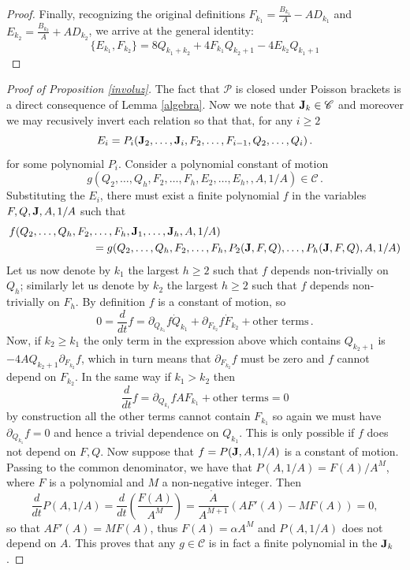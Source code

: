 \documentclass[reqno,11pt]{amsart}
\theoremstyle{plain}
\numberwithin{equation}{section}
\newcommand{\I}{{\texttt{\bf J}}}
\begin{document}
{\begin{proof}
Finally, recognizing the original definitions $F_{k_1} = \frac{B_{k_1}}{A} - AD_{k_1}$ and $E_{k_2} = \frac{B_{k_2}}{A} + AD_{k_2}$, we arrive at the general identity:
\begin{equation}
	\{E_{k_1}, F_{k_2}\} = 8Q_{k_1+k_2} + 4F_{k_1}Q_{k_2+1} - 4E_{k_2}Q_{k_1+1}
\end{equation}
\end{proof}
\begin{proof}[Proof of Proposition \ref{involuz}] The fact that $\mathscr P$ is closed under Poisson brackets is a direct consequence of Lemma \ref{algebra}. 
Now we note that $\I_k\in \mathscr C$ and moreover we may recusively invert each relation so that  that, for any $i\geq 2$
\[
E_i= P_i(\I_2,\dots,\I_i,F_2,\dots, F_{i-1},Q_2,\dots,Q_i)\,.
\]
for some polynomial $P_i$. 
Consider  a polynomial constant of motion
\[
g(Q_2,\dots, Q_{h}, F_2,\dots, F_{h}, E_2,\dots, E_h,,A,1/A)\in \mathscr C\,.
\]
Substituting the $E_i$, there must exist a finite polynomial  $f$ in the variables  $F,Q,\I,A,1/A$ such that 
\[
\begin{aligned}
	f(Q_2,\dots, Q_{h}, F_2,&\dots, F_{h},\I_1,\dots, \I_{h},A,1/A)\\
	&= g(Q_2,\dots, Q_{h}, F_2,\dots, F_{h}, P_2(\I,F,Q),\dots, P_h(\I,F,Q),A,1/A)
\end{aligned}
\]
Let us now denote by $k_1$ the largest $h\geq 2$ such that $f$ depends non-trivially on $Q_h$; similarly let us denote by  $k_2$ the largest $h\geq 2$ such that $f$ depends non-trivially on $F_h$.
By definition $f$ is a constant of motion, so 
\[
0= \frac d{dt}f = \partial_{Q_{k_1}} f  \dot Q_{k_1} +
\partial_{F_{k_2}} f  \dot F_{k_2} + \mbox{other terms}\,.
\]
Now, if $k_2\geq k_1$ the only term in the expression above which contains $ Q_{k_2+1}$ is
$-4 A Q_{k_2+1}\partial_{F_{k_2}} f$, which in turn means that  $\partial_{F_{k_2}} f$ must be zero and $f$ cannot depend on $F_{k_2}$.
In the same way if $k_1>k_2$ then
\[
\frac d{dt}f=\partial_{Q_{k_1}} f A F_{k_1} + \mbox{other terms} =0
\]  
by construction all the other terms cannot contain $F_{k_1}$ so again we must have $\partial_{Q_{k_1}} f =0$ and hence a trivial dependence on $Q_{k_1}$.
This is only possible if $f$ does not depend on $F,Q$.
Now suppose that $f= P(\I,A,1/A)$ is a constant of motion. Passing to the common denominator, we have  that $P(A,1/A)=F(A)/A^M$, where  $F$  is a polynomial and $M$ a non-negative integer. Then
$$
\frac{d}{dt}P(A,1/A)= \frac{d}{dt}\left( \frac{F(A)}{A^M} \right) = \frac{\dot A}{A^{M+1}}\left(AF'(A)-MF(A)\right)=0,
$$
so that  $AF'(A)=MF(A)$, thus $F(A)=\alpha A^M$ and $P(A,1/A)$ does not depend on $A$.
This proves that any $g\in \mathscr{C}$ is in fact a finite polynomial in the $\I_k$.


\end{proof}}
\end{document}
